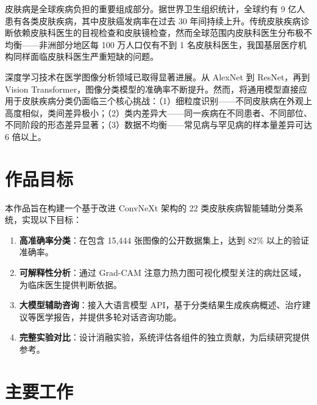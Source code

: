 \documentclass[12pt,a4paper]{report}
\begin{document}
皮肤病是全球疾病负担的重要组成部分。据世界卫生组织统计，全球约有 9 亿人患有各类皮肤疾病，其中皮肤癌发病率在过去 30 年间持续上升。传统皮肤疾病诊断依赖皮肤科医生的目视检查和皮肤镜检查，然而全球范围内皮肤科医生分布极不均衡——非洲部分地区每 100 万人口仅有不到 1 名皮肤科医生，我国基层医疗机构同样面临皮肤科医生严重短缺的问题。

深度学习技术在医学图像分析领域已取得显著进展。从 AlexNet 到 ResNet，再到 Vision Transformer，图像分类模型的准确率不断提升。然而，将通用模型直接应用于皮肤疾病分类仍面临三个核心挑战：（1）细粒度识别——不同皮肤病在外观上高度相似，类间差异极小；（2）类内差异大——同一疾病在不同患者、不同部位、不同阶段的形态差异显著；（3）数据不均衡——常见病与罕见病的样本量差异可达 6 倍以上。

\section{作品目标}

本作品旨在构建一个基于改进 ConvNeXt 架构的 22 类皮肤疾病智能辅助分类系统，实现以下目标：

\begin{enumerate}[leftmargin=2em, itemsep=0.3em]
    \item \textbf{高准确率分类}：在包含 15,444 张图像的公开数据集上，达到 82\% 以上的验证准确率。
    \item \textbf{可解释性分析}：通过 Grad-CAM 注意力热力图可视化模型关注的病灶区域，为临床医生提供判断依据。
    \item \textbf{大模型辅助咨询}：接入大语言模型 API，基于分类结果生成疾病概述、治疗建议等医学报告，并提供多轮对话咨询功能。
    \item \textbf{完整实验对比}：设计消融实验，系统评估各组件的独立贡献，为后续研究提供参考。
\end{enumerate}

\section{主要工作}
\end{document}
